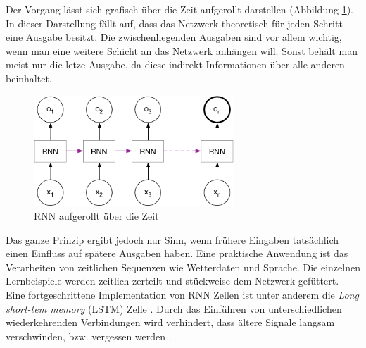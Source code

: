 Der Vorgang lässt sich grafisch über die Zeit aufgerollt darstellen (Abbildung \ref{img:rnn_unrolled}). In dieser Darstellung fällt auf, dass das Netzwerk theoretisch für jeden Schritt eine Ausgabe besitzt. Die zwischenliegenden Ausgaben sind vor allem wichtig, wenn man eine weitere Schicht an das Netzwerk anhängen will. Sonst behält man meist nur die letze Ausgabe, da diese indirekt Informationen über alle anderen beinhaltet.\\
\begin{figure}[hbt]
	\centering
		\includegraphics[width=0.67\textwidth]{assets/rnn_unrolled.png}
	\caption{RNN aufgerollt über die Zeit}
	\label{img:rnn_unrolled}
\end{figure}

Das ganze Prinzip ergibt jedoch nur Sinn, wenn frühere Eingaben tatsächlich einen Einfluss auf spätere Ausgaben haben. Eine praktische Anwendung ist das Verarbeiten von zeitlichen Sequenzen wie Wetterdaten und Sprache. Die einzelnen Lernbeispiele werden  zeitlich zerteilt und stückweise dem Netzwerk gefüttert.
Eine fortgeschrittene Implementation von RNN Zellen ist unter anderem die \textit{Long short-tem memory} (LSTM) Zelle \parencite{schmidhuber}. Durch das Einführen von unterschiedlichen wiederkehrenden Verbindungen wird verhindert, dass ältere Signale langsam verschwinden, bzw. vergessen werden \parencite{chollet}.